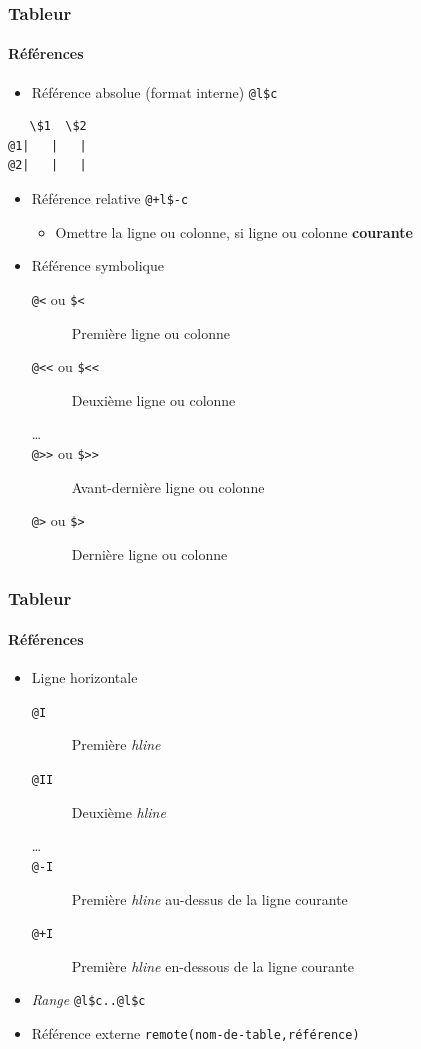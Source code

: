 \documentclass[presentation,t,hideothersubsections]{beamer}
\begin{document}
\begin{frame}[fragile]
\frametitle{Tableur}
\framesubtitle{Références}
\label{sec-3-3-5}


\begin{itemize}
\item Référence absolue (format interne) \texttt{@l\$c}
\end{itemize}

\begin{verbatim}
   \$1  \$2
@1|   |   |
@2|   |   |
\end{verbatim}

\begin{itemize}
\item Référence relative \texttt{@+l\$-c}
\begin{itemize}
\item Omettre la ligne ou colonne, si ligne ou colonne \textbf{courante}
\end{itemize}
\item Référence symbolique
\begin{description}
\item[\texttt{@<} ou \texttt{\$<}] Première ligne ou colonne
\item[\texttt{@<<} ou \texttt{\$<<}] Deuxième ligne ou colonne
\item[\ldots{}] 
\item[\texttt{@>>} ou \texttt{\$>>}] Avant-dernière ligne ou colonne
\item[\texttt{@>} ou \texttt{\$>}] Dernière ligne ou colonne
\end{description}
\end{itemize}
\end{frame}
\begin{frame}
\frametitle{Tableur}
\framesubtitle{Références}
\label{sec-3-3-6}


\begin{itemize}
\item Ligne horizontale
\begin{description}
\item[\texttt{@I}] Première \emph{hline}
\item[\texttt{@II}] Deuxième \emph{hline}
\item[\ldots{}] 
\item[\texttt{@-I}] Première \emph{hline} au-dessus de la ligne courante
\item[\texttt{@+I}] Première \emph{hline} en-dessous de la ligne courante
\end{description}
\item \emph{Range} \texttt{@l\$c..@l\$c}
\item Référence externe \texttt{remote(nom-de-table,référence)}
\end{itemize}
\end{frame}
\end{document}
